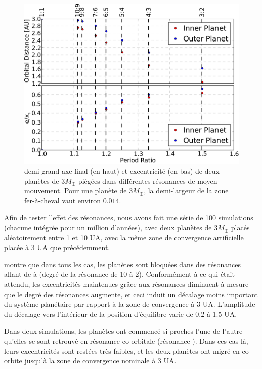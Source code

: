 \begin{figure}[htb]
\centering
\includegraphics[width=0.95\linewidth]{figure/shifted/influence_of_MMR.pdf}
\caption{demi-grand axe final (en haut) et excentricité (en bas) de deux planètes de $3\unit{M_\oplus}$ piégées dans différentes résonances de moyen mouvement. Pour une planète de $3\unit{M_\oplus}$, la demi-largeur de la zone fer-à-cheval vaut environ $0.014$.}\label{fig:influence_of_MMR}
\end{figure}

Afin de tester l'effet des résonances, nous avons fait une série de 100 simulations (chacune intégrée pour un million d'années), avec deux planètes de $3\unit{M_\oplus}$ placés aléatoirement entre 1 et 10 UA, avec la même zone de convergence artificielle placée à 3 UA que précédemment. 

 montre que dans tous les cas, les planètes sont bloquées dans des résonances allant de  à  (degré de la résonance de 10 à 2). Conformément à ce qui était attendu, les excentricités maintenues grâce aux résonances diminuent à mesure que le degré des résonances augmente, et ceci induit un décalage moins important du système planétaire par rapport à la zone de convergence à 3 UA. L'amplitude du décalage vers l'intérieur de la position d'équilibre varie de 0.2 à 1.5 UA. 

Dans deux simulations, les planètes ont commencé si proches l'une de l'autre qu'elles se sont retrouvé en résonance co-orbitale (résonance ). Dans ces cas là, leurs excentricités sont restées très faibles, et les deux planètes ont migré en co-orbite jusqu'à la zone de convergence nominale à 3 UA. 


